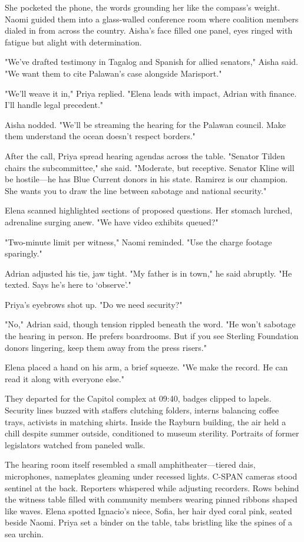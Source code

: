 She pocketed the phone, the words grounding her like the compass's weight. Naomi guided them into a glass-walled conference room where coalition members dialed in from across the country. Aisha's face filled one panel, eyes ringed with fatigue but alight with determination.

"We've drafted testimony in Tagalog and Spanish for allied senators," Aisha said. "We want them to cite Palawan's case alongside Marisport."

"We'll weave it in," Priya replied. "Elena leads with impact, Adrian with finance. I'll handle legal precedent."

Aisha nodded. "We'll be streaming the hearing for the Palawan council. Make them understand the ocean doesn't respect borders."

After the call, Priya spread hearing agendas across the table. "Senator Tilden chairs the subcommittee," she said. "Moderate, but receptive. Senator Kline will be hostile—he has Blue Current donors in his state. Ramirez is our champion. She wants you to draw the line between sabotage and national security."

Elena scanned highlighted sections of proposed questions. Her stomach lurched, adrenaline surging anew. "We have video exhibits queued?"

"Two-minute limit per witness," Naomi reminded. "Use the charge footage sparingly."

Adrian adjusted his tie, jaw tight. "My father is in town," he said abruptly. "He texted. Says he's here to `observe'."

Priya's eyebrows shot up. "Do we need security?"

"No," Adrian said, though tension rippled beneath the word. "He won't sabotage the hearing in person. He prefers boardrooms. But if you see Sterling Foundation donors lingering, keep them away from the press risers."

Elena placed a hand on his arm, a brief squeeze. "We make the record. He can read it along with everyone else."

They departed for the Capitol complex at 09:40, badges clipped to lapels. Security lines buzzed with staffers clutching folders, interns balancing coffee trays, activists in matching shirts. Inside the Rayburn building, the air held a chill despite summer outside, conditioned to museum sterility. Portraits of former legislators watched from paneled walls.

The hearing room itself resembled a small amphitheater—tiered dais, microphones, nameplates gleaming under recessed lights. C-SPAN cameras stood sentinel at the back. Reporters whispered while adjusting recorders. Rows behind the witness table filled with community members wearing pinned ribbons shaped like waves. Elena spotted Ignacio's niece, Sofia, her hair dyed coral pink, seated beside Naomi. Priya set a binder on the table, tabs bristling like the spines of a sea urchin.

